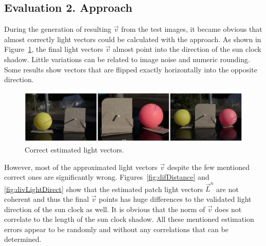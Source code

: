 \subsection{Evaluation 2. Approach}
During the generation of resulting $\vec{v}$ from the test images, it became obvious that almost correctly light vectors could be calculated with the approach. As shown in Figure~\ref{fig:goodRes}, the final light vectors $\vec{v}$ almost point into the direction of the sun clock shadow. Little variations can be related to image noise and numeric rounding. Some results show vectors that are flipped exactly horizontally into the opposite direction.
\begin{figure}[H] 
	\center 
	\includegraphics[width=\linewidth]{Images/Korrekte_Lightvectoren.jpg}	
	\caption[Bildunterschrift]{Correct estimated light vectors.}	
		\label{fig:goodRes}	
\end{figure}
However, most of the approximated light vectors $\vec{v}$ despite the few mentioned correct ones are significantly wrong. Figures~\ref{fig:difDistance} and \ref{fig:divLightDirect} show that the estimated patch light vectors $\vec{L}^n$ are not coherent and thus the final $\vec{v}$ points has huge differences to the validated light direction of the sun clock as well. It is obvious that the norm of $\vec{v}$ does not correlate to the length of the sun clock shadow. All these mentioned estimation errors appear to be randomly and without any correlations that can be determined. 

